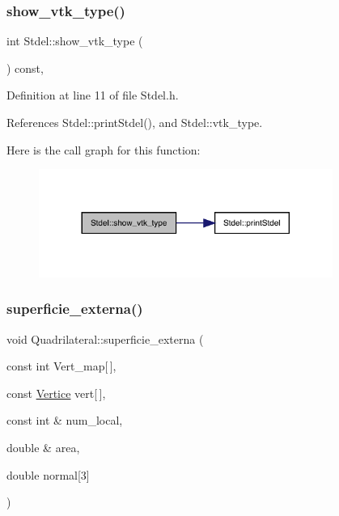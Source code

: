 \subsubsection{\texorpdfstring{show\+\_\+vtk\+\_\+type()}{show\_vtk\_type()}}
{\footnotesize\ttfamily int Stdel\+::show\+\_\+vtk\+\_\+type (\begin{DoxyParamCaption}{ }\end{DoxyParamCaption}) const\hspace{0.3cm}{\ttfamily [inline]}, {\ttfamily [inherited]}}



Definition at line 11 of file Stdel.\+h.



References Stdel\+::print\+Stdel(), and Stdel\+::vtk\+\_\+type.

Here is the call graph for this function\+:
\nopagebreak
\begin{figure}[H]
\begin{center}
\leavevmode
\includegraphics[width=272pt]{classStdel_a56288a857b95a55c8b7eb5b473e836d9_cgraph}
\end{center}
\end{figure}
\mbox{\label{classQuadrilateral_aef8a1501a818c1a7470a62d5cc7fd3d8}} 
\subsubsection{\texorpdfstring{superficie\+\_\+externa()}{superficie\_externa()}}
{\footnotesize\ttfamily void Quadrilateral\+::superficie\+\_\+externa (\begin{DoxyParamCaption}\item[{const int}]{Vert\+\_\+map\mbox{[}$\,$\mbox{]},  }\item[{const \hyperlink{structVertice}{Vertice}}]{vert\mbox{[}$\,$\mbox{]},  }\item[{const int \&}]{num\+\_\+local,  }\item[{double \&}]{area,  }\item[{double}]{normal\mbox{[}3\mbox{]} }\end{DoxyParamCaption})\hspace{0.3cm}{\ttfamily [virtual]}}



